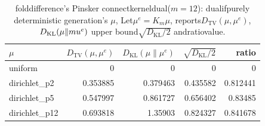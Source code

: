 \begin{table}[H]
\centering
\scriptsize
\setlength{\tabcolsep}{4pt}
\caption{folddifference's  Pinsker connectkerneldual($m=12$): dualifpurely deterministic generation's  $\mu$, Let$\mu^e=K_m\mu$, reports$D_{\mathrm{TV}}(\mu,\mu^e)$, $D_{\mathrm{KL}}(\mu\|\\mu^e)$ upper bound$\sqrt{D_{\mathrm{KL}}/2}$ andratiovalue.}
\label{tab:fold_pinsker_residual_bridge}
\begin{tabular}{lrrrr}
\toprule
$\mu$ & $D_{\mathrm{TV}}(\mu,\mu^e)$ & $D_{\mathrm{KL}}(\mu\|\mu^e)$ & $\sqrt{D_{\mathrm{KL}}/2}$ & ratio\\
\midrule
uniform & 0 & 0 & 0 & 0\\
dirichlet\_p2 & 0.353885 & 0.379463 & 0.435582 & 0.812441\\
dirichlet\_p5 & 0.547997 & 0.861727 & 0.656402 & 0.83485\\
dirichlet\_p12 & 0.693818 & 1.35903 & 0.824327 & 0.841678\\
\bottomrule
\end{tabular}
\end{table}

